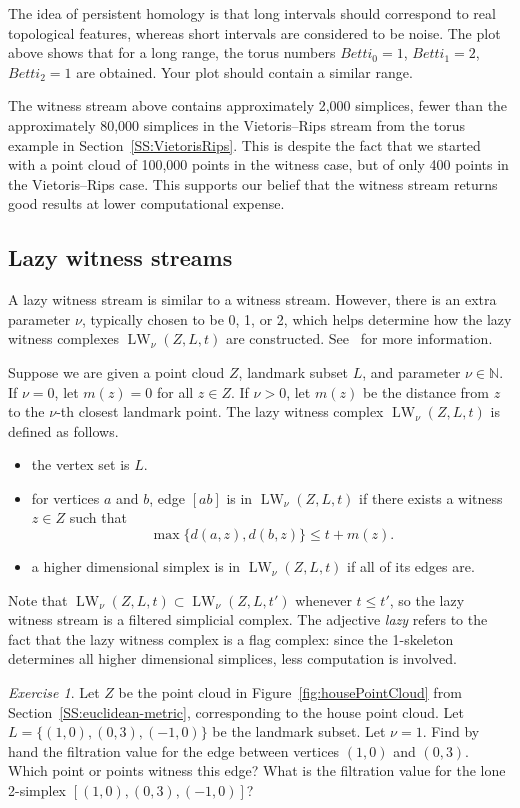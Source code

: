 \documentclass[amscd, amssymb, verbatim]{amsart}[12pt]
\theoremstyle{remark}
\newtheorem{exercise}{Exercise}
\theoremstyle{remark}
\theoremstyle{remark}
\DeclareMathOperator{\LW}{LW}
\newcommand{\N}{\mathbb{N}}
\begin{document}
The idea of persistent homology is that long intervals should correspond to real topological features, whereas short intervals are considered to be noise. The plot above shows that for a long range, the torus numbers $Betti_0 = 1$, $Betti_1 = 2$, $Betti_2 = 1$ are obtained. Your plot should contain a similar range.

The witness stream above contains approximately 2,000 simplices, fewer than the approximately 80,000 simplices in the Vietoris--Rips stream from the torus example in Section~\ref{SS:VietorisRips}. This is despite the fact that we started with a point cloud of 100,000 points in the witness case, but of only 400 points in the Vietoris--Rips case. This supports our belief that the witness stream returns good results at lower computational expense. 


\subsection{Lazy witness streams}
A lazy witness stream is similar to a witness stream. However, there is an extra parameter $\nu$, typically chosen to be 0, 1, or 2, which helps determine how the lazy witness complexes $\LW_\nu(Z,L,t)$ are constructed. See~\citet{WitnessComplexes} for more information. 

Suppose we are given a point cloud $Z$, landmark subset $L$, and parameter $\nu\in\N$. If $\nu = 0$, let $m(z) = 0$ for all $z\in Z$. If $\nu >0$, let $m(z)$ be the distance from $z$ to the $\nu$-th closest landmark point. The lazy witness complex $\LW_\nu(Z,L,t)$ is defined as follows.
\begin{itemize}
\item{the vertex set is $L$.}
\item{for vertices $a$ and $b$, edge $[ab]$ is in $\LW_\nu(Z,L,t)$ if there exists a witness $z \in Z$ such that $$\max\bigl\{d(a,z), d(b,z)\bigr\} \leq t+m(z).$$}
\item{a higher dimensional simplex is in $\LW_\nu(Z,L,t)$ if all of its edges are.} 
\end{itemize}
Note that $\LW_\nu(Z,L,t) \subset \LW_\nu(Z,L,t')$ whenever $t\leq t'$, so the lazy witness stream is a filtered simplicial complex. The adjective {\em lazy} refers to the fact that the lazy witness complex is a flag complex: since the 1-skeleton determines all higher dimensional simplices, less computation is involved. 

\begin{exercise}
Let $Z$ be the point cloud in Figure~\ref{fig:housePointCloud} from Section~\ref{SS:euclidean-metric}, corresponding to the house point cloud. Let $L = \{(1,0),(0,3),(-1,0)\}$ be the landmark subset. Let $\nu = 1$. Find by hand the filtration value for the edge between vertices $(1,0)$ and $(0,3)$. Which point or points witness this edge? What is the filtration value for the lone 2-simplex $[(1,0),(0,3),(-1,0)]$? 
\end{exercise}
\end{document}
